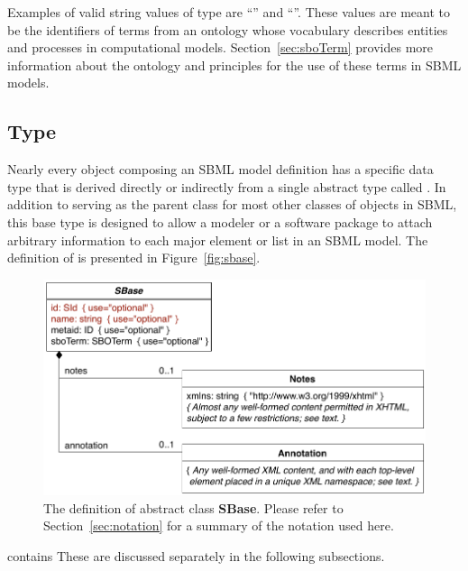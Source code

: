 Examples of valid string values of type  are
``'' and ``''.  These values
are meant to be the identifiers of terms from an ontology whose
vocabulary describes entities and processes in computational
models.  Section~\ref{sec:sboTerm} provides more information about
the ontology and principles for the use of these terms in SBML
models.


\subsection{Type }
\label{sec:sbase}

Nearly every object composing an SBML \thisL model definition has
a specific data type that is derived directly or indirectly from a
single abstract type called \SBase.  In addition to serving as the
parent class for most other classes of objects in SBML, this base
type is designed to allow a modeler or a software package to
attach arbitrary information to each major element or list in an
SBML model.  The definition of \SBase is presented in
Figure~\vref{fig:sbase}.

\begin{figure}[hbt]
  \vspace*{-0.5ex}
  \centering
  \small
  \includegraphics[scale=0.8]{figs/sbase-uml}
  \caption{The definition of abstract class \textup{\textbf{\textsf{SBase}}}.  Please refer
    to Section~\protect\ref{sec:notation} for a summary of the
    notation used here.}
  \label{fig:sbase}
\end{figure}

\SBase contains   These are discussed separately in the following
subsections.



